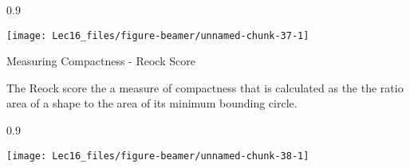 \documentclass[11pt,ignorenonframetext,]{beamer}
\newenvironment{Shaded}{}{}
\newcommand{\DataTypeTok}[1]{\textcolor[rgb]{0.56,0.13,0.00}{#1}}
\newcommand{\DecValTok}[1]{\textcolor[rgb]{0.25,0.63,0.44}{#1}}
\newcommand{\KeywordTok}[1]{\textcolor[rgb]{0.00,0.44,0.13}{\textbf{#1}}}
\newcommand{\NormalTok}[1]{#1}
\newcommand{\OperatorTok}[1]{\textcolor[rgb]{0.40,0.40,0.40}{#1}}
\newcommand{\OtherTok}[1]{\textcolor[rgb]{0.00,0.44,0.13}{#1}}
\newcommand{\StringTok}[1]{\textcolor[rgb]{0.25,0.44,0.63}{#1}}
\let\oldShaded\Shaded
\let\endoldShaded\endShaded
\renewenvironment{Shaded}{\footnotesize\begin{spacing}{0.9}\oldShaded}{\endoldShaded\end{spacing}}
\begin{document}
\begin{frame}[fragile]{}
\protect\hypertarget{section-4}{}

\begin{Shaded}
\end{Shaded}

\begin{center}\texttt{[image: Lec16\_files/figure-beamer/unnamed-chunk-37-1]} \end{center}

\end{frame}

\begin{frame}[fragile,t]{Measuring Compactness - Reock Score}
\protect\hypertarget{measuring-compactness---reock-score}{}

The Reock score the a measure of compactness that is calculated as the
the ratio area of a shape to the area of its minimum bounding circle.

\begin{Shaded}
\end{Shaded}

\begin{center}\texttt{[image: Lec16\_files/figure-beamer/unnamed-chunk-38-1]} \end{center}

\end{frame}
\end{document}
